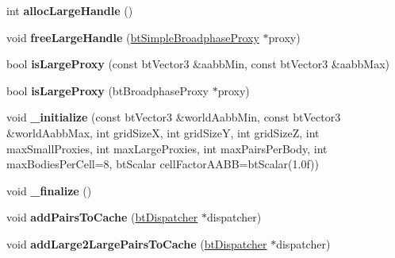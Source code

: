\begin{DoxyCompactItemize}
\mbox{\label{classbtGpu3DGridBroadphase_a640c838da14e12aa1244b46bd134ee3a}} 
int {\bfseries alloc\+Large\+Handle} ()
\item 
\mbox{\label{classbtGpu3DGridBroadphase_a886be1bf1f2ebb9c18bd7ec714961794}} 
void {\bfseries free\+Large\+Handle} (\hyperlink{structbtSimpleBroadphaseProxy}{bt\+Simple\+Broadphase\+Proxy} $\ast$proxy)
\item 
\mbox{\label{classbtGpu3DGridBroadphase_a131cfab867b25116adb72d79435be34d}} 
bool {\bfseries is\+Large\+Proxy} (const bt\+Vector3 \&aabb\+Min, const bt\+Vector3 \&aabb\+Max)
\item 
\mbox{\label{classbtGpu3DGridBroadphase_a54623ad8091800695dcb9487da21ff4b}} 
bool {\bfseries is\+Large\+Proxy} (bt\+Broadphase\+Proxy $\ast$proxy)
\item 
\mbox{\label{classbtGpu3DGridBroadphase_a015bbc0dea05a6b9c5256c4cf5b290d0}} 
void {\bfseries \+\_\+initialize} (const bt\+Vector3 \&world\+Aabb\+Min, const bt\+Vector3 \&world\+Aabb\+Max, int grid\+SizeX, int grid\+SizeY, int grid\+SizeZ, int max\+Small\+Proxies, int max\+Large\+Proxies, int max\+Pairs\+Per\+Body, int max\+Bodies\+Per\+Cell=8, bt\+Scalar cell\+Factor\+A\+A\+BB=bt\+Scalar(1.\+0f))
\item 
\mbox{\label{classbtGpu3DGridBroadphase_aa12d32dc4ad28e00961834e81719de19}} 
void {\bfseries \+\_\+finalize} ()
\item 
\mbox{\label{classbtGpu3DGridBroadphase_ad57933c61551ee1fc7f92ce911213228}} 
void {\bfseries add\+Pairs\+To\+Cache} (\hyperlink{classbtDispatcher}{bt\+Dispatcher} $\ast$dispatcher)
\item 
\mbox{\label{classbtGpu3DGridBroadphase_ad0bb78dee2cd822d0fa687ea5aa72a21}} 
void {\bfseries add\+Large2\+Large\+Pairs\+To\+Cache} (\hyperlink{classbtDispatcher}{bt\+Dispatcher} $\ast$dispatcher)
\item 
\mbox{\label{classbtGpu3DGridBroadphase_a21fa5315f93558139cad53bc493a93f7}} 

\end{DoxyCompactItemize}
